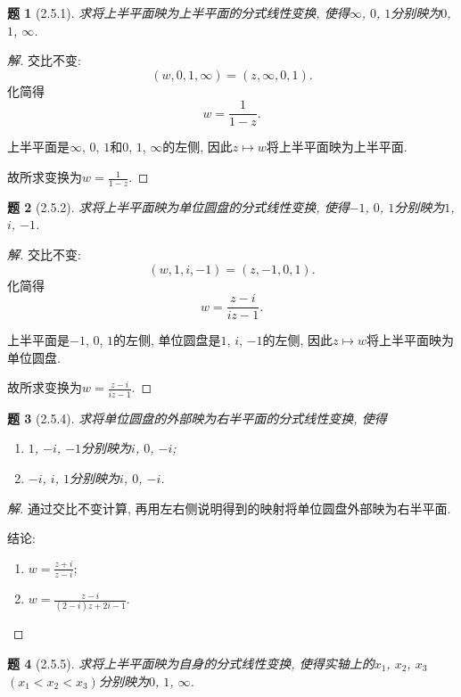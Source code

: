 \documentclass{article}[a4paper, 12pt]
\newtheorem{problem}{题}
\newenvironment{solution}{\begin{proof}[解]}{\end{proof}}
\begin{document}
\begin{problem}[2.5.1]
  求将上半平面映为上半平面的分式线性变换, 使得\(\infty\), \(0\), \(1\)分别映为\(0\), \(1\), \(\infty\).
\end{problem}

\begin{solution}
  交比不变:
  \[(w, 0, 1, \infty)=(z,\infty,0,1).\]
  化简得
  \[w=\frac{1}{1-z}.\]

  上半平面是\(\infty\), \(0\), \(1\)和\(0\), \(1\), \(\infty\)的左侧, 因此\(z\mapsto w\)将上半平面映为上半平面.

  故所求变换为\(w=\frac{1}{1-z}\).
\end{solution}

\begin{problem}[2.5.2]
  求将上半平面映为单位圆盘的分式线性变换, 使得\(-1\), \(0\), \(1\)分别映为\(1\), \(i\), \(-1\).
\end{problem}

\begin{solution}
  交比不变:
  \[(w, 1, i, -1)=(z,-1,0,1).\]
  化简得
  \[w=\frac{z-i}{iz-1}.\]

  上半平面是\(-1\), \(0\), \(1\)的左侧, 单位圆盘是\(1\), \(i\), \(-1\)的左侧, 因此\(z\mapsto w\)将上半平面映为单位圆盘.

  故所求变换为\(w=\frac{z-i}{iz-1}\).
\end{solution}

\begin{problem}[2.5.4]
  求将单位圆盘的外部映为右半平面的分式线性变换, 使得
  \begin{enumerate}
    \item \(1\), \(-i\), \(-1\)分别映为\(i\), \(0\), \(-i\);
    \item \(-i\), \(i\), \(1\)分别映为\(i\), \(0\), \(-i\).
  \end{enumerate}
\end{problem}

\begin{solution}
  通过交比不变计算, 再用左右侧说明得到的映射将单位圆盘外部映为右半平面.

  结论:
  \begin{enumerate}
    \item \(w=\frac{z+i}{z-i}\);
    \item \(w=\frac{z-i}{(2-i)z+2i-1}\).
  \end{enumerate}
\end{solution}

\begin{problem}[2.5.5]
  求将上半平面映为自身的分式线性变换, 使得实轴上的\(x_1\), \(x_2\), \(x_3\) \((x_1<x_2<x_3)\)分别映为\(0\), \(1\), \(\infty\).
\end{problem}
\end{document}
